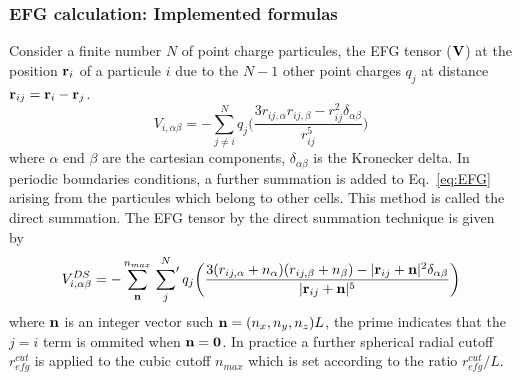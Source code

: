 \documentclass[a4paper]{article}
\def\nn{{\bf n}}
\def\rr{{\bf r}}
\def\00{{\bf 0}}
\begin{document}
\subsubsection{EFG calculation: Implemented formulas}

Consider a finite number $N$ of point charge particules, the EFG tensor
($\bf{V}$) at the position $\rr_i$ of a particule $i$ due to the
$N-1$ other point charges $q_j$ at distance $\rr_{ij}=\rr_i-\rr_j$.
\begin{equation}
V_{i,\alpha\beta} = - \sum_{j\ne i}^N q_j \bigg( \frac {3 r_{ij,\alpha} r_{ij,\beta} - r_{ij}^2\delta_{\alpha\beta} } {r_{ij}^5} \bigg )
\label{eq:EFG}
\end{equation}
where  $\alpha$ end $\beta$ are the cartesian components, $\delta_{\alpha\beta}$
is the Kronecker delta.
In periodic boundaries conditions, a further summation is added to
Eq.~\ref{eq:EFG} arising from the particules which belong to other cells.
This method is called the direct summation. The EFG tensor by the direct
summation technique is given by
\begin{equation}
V^{DS}_{i,\alpha\beta} = - \sum_\nn^{n_{max}} \sideset{}{'}\sum^{N}_j \\ q_j\bigg(\frac{3 (r_{ij,\alpha}+n_\alpha) (r_{ij,\beta}+n_\beta) - |\rr_{ij}+\nn|^2\delta_{\alpha\beta} } { |\rr_{ij}+\nn|^5 } \bigg )
\end{equation}
where $\nn$ is an integer vector such $\nn=(n_x,n_y,n_z)L$, the prime indicates
that the $j=i$ term is ommited when $\nn=\00$. In practice a further spherical
radial cutoff $r^{cut}_{efg}$ is applied to the cubic cutoff $n_{max}$ which is set
according to the ratio $r^{cut}_{efg}/L$.

\end{document}
